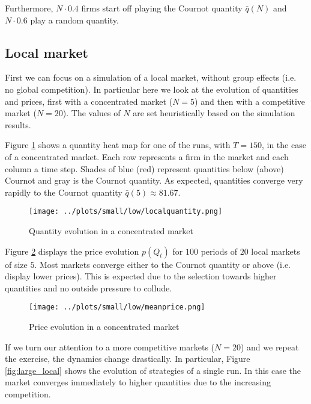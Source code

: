 \documentclass[american]{scrartcl}
\begin{document}
Furthermore, $N \cdot 0.4$ firms start off playing the Cournot quantity $\bar{q}(N)$ and $N \cdot 0.6$ play a random quantity.

\subsection{Local market}

First we can focus on a simulation of a local market, without group effects (i.e. no global competition). In particular here we look at the evolution of quantities and prices, first with a concentrated market ($N = 5$) and then with a competitive market ($N = 20$). The values of $N$ are set heuristically based on the simulation results.

Figure \ref{fig:small_local} shows a quantity heat map for one of the runs, with $T = 150$, in the case of a concentrated market. Each row represents a firm in the market and each column a time step. Shades of blue (red) represent quantities below (above) Cournot and gray is the Cournot quantity. As expected, quantities converge very rapidly to the Cournot quantity $\bar{q}(5) \approx 81.67$.

\begin{center}
    \begin{figure}[H]
        \center
        \texttt{[image: ../plots/small/low/localquantity.png]}
        \caption{Quantity evolution in a concentrated market}
        \label{fig:small_local}
    \end{figure}
\end{center}

Figure \ref{fig:price_small_local} displays the price evolution $p(Q_t)$ for $100$ periods of $20$ local markets of size $5$. Most markets converge either to the Cournot quantity or above (i.e. display lower prices). This is expected due to the selection towards higher quantities and no outside pressure to collude.

\begin{center}
    \begin{figure}[H]
        \center
        \texttt{[image: ../plots/small/low/meanprice.png]}
        \caption{Price evolution in a concentrated market}
        \label{fig:price_small_local}
    \end{figure}
\end{center}

If we turn our attention to a more competitive markets ($N=20$) and we repeat the exercise, the dynamics change drastically. In particular, Figure \ref{fig:large_local} shows the evolution of strategies of a single run. In this case the market converges immediately to higher quantities due to the increasing competition.
\end{document}
